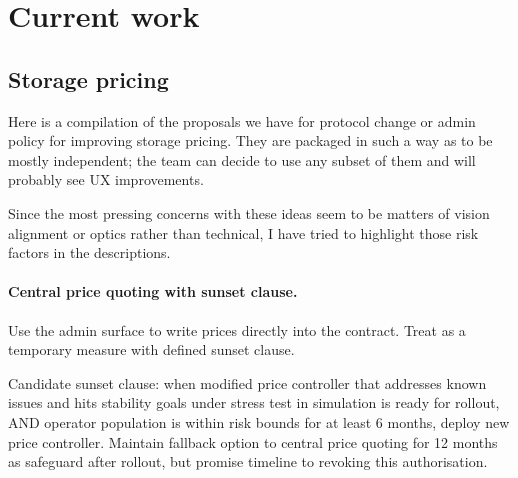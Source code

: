 \section*{Current work}

\subsection*{Storage pricing}

Here is a compilation of the proposals we have for protocol change or admin policy for improving storage pricing.
%
They are packaged in such a way as to be mostly independent; the team can decide to use any subset of them and will probably see UX improvements.

Since the most pressing concerns with these ideas seem to be matters of vision alignment or optics rather than technical, I have tried to highlight those risk factors in the descriptions.

\paragraph{Central price quoting with sunset clause.}

Use the admin surface to write prices directly into the  contract. Treat as a temporary measure with defined sunset clause.

Candidate sunset clause: when modified price controller that addresses known issues and hits stability goals under stress test in simulation is ready for rollout, AND operator population is within risk bounds for at least 6 months, deploy new price controller. Maintain fallback option to central price quoting for 12 months as safeguard after rollout, but promise timeline to revoking this authorisation.

